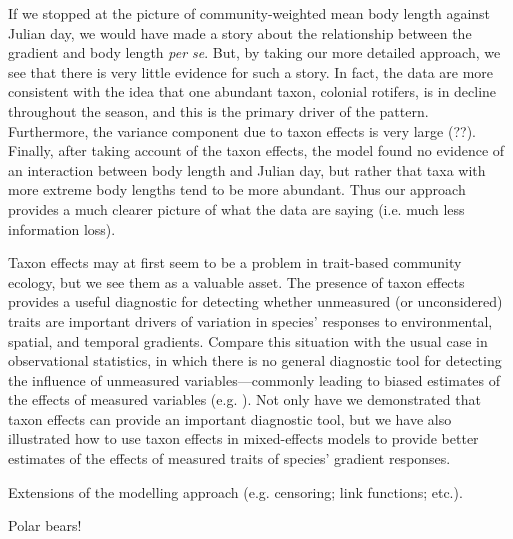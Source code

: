 \documentclass[12pt]{ecology}
\begin{document}
If we stopped at the picture of community-weighted mean body length against Julian day, we would have made a story about the relationship between the gradient and body length \emph{per se}.  But, by taking our more detailed approach, we see that there is very little evidence for such a story.  In fact, the data are more consistent with the idea that one abundant taxon, colonial rotifers, is in decline throughout the season, and this is the primary driver of the pattern.  Furthermore, the variance component due to taxon effects is very large (??).  Finally, after taking account of the taxon effects, the model found no evidence of an interaction between body length and Julian day, but rather that taxa with more extreme body lengths tend to be more abundant.  Thus our approach provides a much clearer picture of what the data are saying (i.e. much less information loss).

Taxon effects may at first seem to be a problem in trait-based community ecology, but we see them as a valuable asset.  The presence of taxon effects provides a useful diagnostic for detecting whether unmeasured (or unconsidered) traits are important drivers of variation in species' responses to environmental, spatial, and temporal gradients.  Compare this situation with the usual case in observational statistics, in which there is no general diagnostic tool for detecting the influence of unmeasured variables---commonly leading to biased estimates of the effects of measured variables (e.g. ).  Not only have we demonstrated that taxon effects can provide an important diagnostic tool, but we have also illustrated how to use taxon effects in mixed-effects models to provide better estimates of the effects of measured traits of species' gradient responses.

Extensions of the modelling approach (e.g. censoring; link functions; etc.).


Polar bears!



\end{document}
